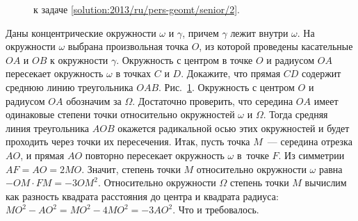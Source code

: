 \ifsolution
\begin{figure}\centering
    \caption{к задаче \ref{solution:2013/ru/pers-geomt/senior/2}.}
    \label{fig:solution:2013/ru/pers-geomt/senior/2}
\end{figure}
\fi %

\problem
Даны концентрические окружности $\omega$ и $\gamma$, причем $\gamma$ лежит
внутри $\omega$.
На окружности $\omega$ выбрана произвольная точка $O$, из которой проведены
касательные $OA$ и $OB$ к окружности $\gamma$.
Окружность с центром в точке $O$ и радиусом $OA$ пересекает окружность $\omega$
в точках $C$ и $D$.
Докажите, что прямая $CD$ содержит среднюю линию треугольника $OAB$.
\solution
\label{solution:2013/ru/pers-geomt/senior/2}
Рис.~\ref{fig:solution:2013/ru/pers-geomt/senior/2}.
Окружность с центром $O$ и радиусом $OA$ обозначим за $\Omega$.
Достаточно проверить, что середина $OA$ имеет одинаковые степени точки
относительно окружностей $\omega$ и $\Omega$.
Тогда средняя линия треугольника $AOB$ окажется радикальной осью этих
окружностей и будет проходить через точки их пересечения.
Итак, пусть точка $M$~--- середина отрезка $AO$, и прямая $AO$ повторно
пересекает окружность $\omega$ в~точке $F$.
Из симметрии $AF = AO = 2 MO$.
Значит, степень точки $M$ относительно окружности $\omega$ равна
$- OM \cdot FM = - 3 OM^2$.
Относительно окружности $\Omega$ степень точки $M$ вычислим как разность
квадрата расстояния до центра и квадрата радиуса:
$MO^2 - AO^2 = MO^2 - 4 MO^2 = - 3 AO^2$.
Что и требовалось.
\endproblem

